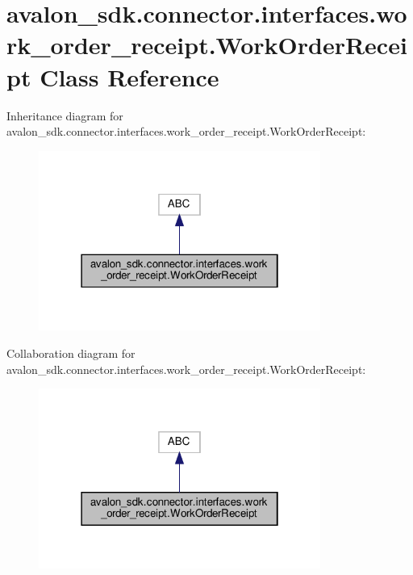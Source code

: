 \hypertarget{classavalon__sdk_1_1connector_1_1interfaces_1_1work__order__receipt_1_1WorkOrderReceipt}{}\section{avalon\+\_\+sdk.\+connector.\+interfaces.\+work\+\_\+order\+\_\+receipt.\+Work\+Order\+Receipt Class Reference}
\label{classavalon__sdk_1_1connector_1_1interfaces_1_1work__order__receipt_1_1WorkOrderReceipt}


Inheritance diagram for avalon\+\_\+sdk.\+connector.\+interfaces.\+work\+\_\+order\+\_\+receipt.\+Work\+Order\+Receipt\+:
\nopagebreak
\begin{figure}[H]
\begin{center}
\leavevmode
\includegraphics[width=262pt]{classavalon__sdk_1_1connector_1_1interfaces_1_1work__order__receipt_1_1WorkOrderReceipt__inherit__graph}
\end{center}
\end{figure}


Collaboration diagram for avalon\+\_\+sdk.\+connector.\+interfaces.\+work\+\_\+order\+\_\+receipt.\+Work\+Order\+Receipt\+:
\nopagebreak
\begin{figure}[H]
\begin{center}
\leavevmode
\includegraphics[width=262pt]{classavalon__sdk_1_1connector_1_1interfaces_1_1work__order__receipt_1_1WorkOrderReceipt__coll__graph}
\end{center}
\end{figure}
